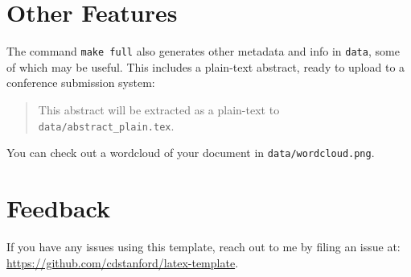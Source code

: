 \documentclass{article}
\begin{document}
\section{Other Features}

The command \texttt{make full} also generates other metadata and info in \texttt{data}, some of which may be useful.
This includes a plain-text abstract, ready to upload to a conference submission system:

\begin{abstract}
This abstract will be extracted as a plain-text to \texttt{data/abstract\_plain.tex}.
\end{abstract}

You can check out a wordcloud of your document in \texttt{data/wordcloud.png}.

\section{Feedback}

If you have any issues using this template, reach out to me by filing an issue at:
\url{https://github.com/cdstanford/latex-template}.



\end{document}
